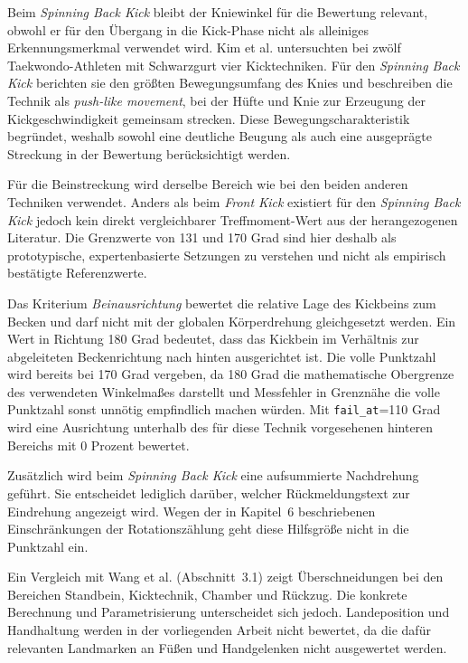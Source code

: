 \documentclass[intern]{cgMA}
\begin{document}
Beim \textit{Spinning Back Kick} bleibt der Kniewinkel für die Bewertung relevant, obwohl er für den Übergang in die Kick-Phase nicht als alleiniges Erkennungsmerkmal verwendet wird. Kim et al. \cite{Kim2011} untersuchten bei zwölf Taekwondo-Athleten mit Schwarzgurt vier Kicktechniken. Für den \textit{Spinning Back Kick} berichten sie den größten Bewegungsumfang des Knies und beschreiben die Technik als \textit{push-like movement}, bei der Hüfte und Knie zur Erzeugung der Kickgeschwindigkeit gemeinsam strecken. Diese Bewegungscharakteristik begründet, weshalb sowohl eine deutliche Beugung als auch eine ausgeprägte Streckung in der Bewertung berücksichtigt werden.

Für die Beinstreckung wird derselbe Bereich wie bei den beiden anderen Techniken verwendet. Anders als beim \textit{Front Kick} existiert für den \textit{Spinning Back Kick} jedoch kein direkt vergleichbarer Treffmoment-Wert aus der herangezogenen Literatur. Die Grenzwerte von 131 und 170 Grad sind hier deshalb als prototypische, expertenbasierte Setzungen zu verstehen und nicht als empirisch bestätigte Referenzwerte.

Das Kriterium \textit{Beinausrichtung} bewertet die relative Lage des Kickbeins zum Becken und darf nicht mit der globalen Körperdrehung gleichgesetzt werden. Ein Wert in Richtung 180 Grad bedeutet, dass das Kickbein im Verhältnis zur abgeleiteten Beckenrichtung nach hinten ausgerichtet ist. Die volle Punktzahl wird bereits bei 170 Grad vergeben, da 180 Grad die mathematische Obergrenze des verwendeten Winkelmaßes darstellt und Messfehler in Grenznähe die volle Punktzahl sonst unnötig empfindlich machen würden. Mit \texttt{fail\_at}=110 Grad wird eine Ausrichtung unterhalb des für diese Technik vorgesehenen hinteren Bereichs mit 0 Prozent bewertet.

Zusätzlich wird beim \textit{Spinning Back Kick} eine aufsummierte Nachdrehung geführt. Sie entscheidet lediglich darüber, welcher Rückmeldungstext zur Eindrehung angezeigt wird. Wegen der in Kapitel~6 beschriebenen Einschränkungen der Rotationszählung geht diese Hilfsgröße nicht in die Punktzahl ein.

Ein Vergleich mit Wang et al. (Abschnitt~3.1) zeigt Überschneidungen bei den Bereichen Standbein, Kicktechnik, Chamber und Rückzug. Die konkrete Berechnung und Parametrisierung unterscheidet sich jedoch. Landeposition und Handhaltung werden in der vorliegenden Arbeit nicht bewertet, da die dafür relevanten Landmarken an Füßen und Handgelenken nicht ausgewertet werden.
\end{document}
